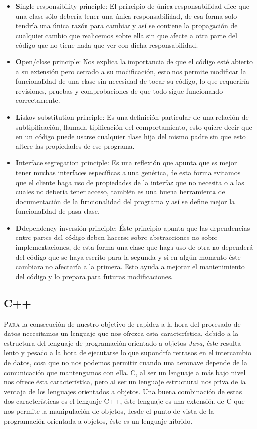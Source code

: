 \documentclass[12pt,a4paper,spanish]{book} %
\begin{document}
\begin{itemize}
\item\textbf{S}ingle responsibility principle: El principio de única responsabilidad dice que una clase sólo debería tener una única responsabilidad, de esa forma solo tendría una única razón para cambiar y así se contiene la propagación de cualquier cambio que realicemos sobre ella sin que afecte a otra parte del código que no tiene nada que ver con dicha responsabilidad.
\item\textbf{O}pen/close principle: Nos explica la importancia de que el código esté abierto a su extensión pero cerrado a su modificación, esto nos permite modificar la funcionalidad de una clase sin necesidad de tocar su código, lo que requeriría revisiones, pruebas y comprobaciones de que todo sigue funcionando correctamente.
\item\textbf{L}iskov substitution principle: Es una definición particular de una relación de subtipificación, llamada tipificación del comportamiento, esto quiere decir que en un código puede usarse cualquier clase hija del mismo padre sin que esto altere las propiedades de ese programa.
\item\textbf{I}nterface segregation principle: Es una reflexión que apunta que es mejor tener muchas interfaces específicas a una genérica, de esta forma evitamos que el cliente haga uso de propiedades de la interfaz que no necesita o a las cuales no debería tener acceso, también es una buena herramienta de documentación de la funcionalidad del programa y así se define mejor la funcionalidad de pasa clase.
\item\textbf{D}dependency inversión principle: Éste principio apunta que las dependencias entre partes del código deben hacerse sobre abstracciones no sobre implementaciones, de esta forma una clase que haga uso de otra no dependerá del código que se haya escrito para la segunda y si en algún momento éste cambiara no afectaría a la primera. Esto ayuda a mejorar el mantenimiento del código y lo prepara para futuras modificaciones.
\end{itemize}

\newpage
\subsection{C++}

\lettrine{P}{ara} la consecución de nuestro objetivo de rapidez a la hora del procesado de datos necesitamos un lenguaje que nos ofrezca esta característica, debido a la estructura del lenguaje de programación orientado a objetos \emph{Java}, éste resulta lento y pesado a la hora de ejecutarse lo que supondría retrasos en el intercambio de datos, cosa que no nos podemos permitir cuando una aeronave depende de la comunicación que mantengamos con ella. C, al ser un lenguaje a más bajo nivel nos ofrece ésta característica, pero al ser un lenguaje estructural nos priva de la ventaja de los lenguajes orientados a objetos. Una buena combinación de estas dos características es el lenguaje C++, éste lenguaje es una extensión de C que nos permite la manipulación de objetos, desde el punto de vista de la programación orientada a objetos, éste es un lenguaje híbrido.
\end{document}

